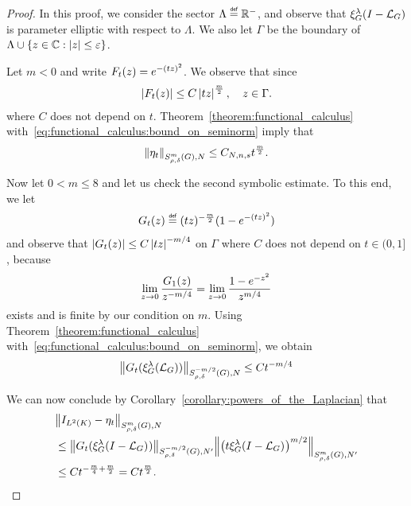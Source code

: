 \begin{proof}
    In this proof, we consider the sector $\Lambda \defeq \R^-$,
    and observe that $\Rep \lambda \BesselPotentialSquared {}$ is parameter elliptic with respect to $\Lambda$.
    We also let $\Gamma$ be the boundary of $\Lambda \cup \{z \in \C : \abs z \leq \epsilon\}$.

    Let $m < 0$ and write $F_t(z) = {\e^{-(t z)^2}}$.
    We observe that since
    \begin{align*}
        \abs {F_t(z)} \leq C \abs {t z}^\frac m 2,
        \quad z \in \Gamma.
    \end{align*}
    where $C$ does not depend on $t$.
    Theorem~\ref{theorem:functional_calculus} with~\eqref{eq:functional_calculus:bound_on_seminorm} imply that
    \begin{align*}
        \SymbolSemiNorm {m} {\rho, \delta} N {\eta_t}
        \leq C_{N, n, s} t^{\frac m 2}.
    \end{align*}

    Now let $0 < m \leq 8$ and let us check the second symbolic estimate.
    To this end,
    we let
    \begin{align*}
        G_t(z) \defeq (t z)^{-\frac m 2} (1 - \e^{-(t z)^2})
    \end{align*}
    and observe that $\abs {G_t(z)} \leq C \abs {t z}^{-m/4}$ on $\Gamma$ where $C$ does not depend on $t \in (0, 1]$,
    because
    \begin{align*}
        \lim_{z \to 0} \frac {G_1(z)}{z^{-m / 4}}
        = \lim_{z \to 0} \frac {1 - \e^{-z^2}} {z^{m / 4}}
    \end{align*}
    exists and is finite by our condition on $m$.
    Using Theorem~\ref{theorem:functional_calculus} with~\eqref{eq:functional_calculus:bound_on_seminorm},
    we obtain
    \begin{align*}
        \SymbolSemiNorm {-m/2} {\rho, \delta} N {G_t(\Rep \lambda (\Laplacian))}
        \leq C t^{-m/4}
    \end{align*}

    We can now conclude by Corollary~\ref{corollary:powers_of_the_Laplacian} that
    \begin{align*}
        &\SymbolSemiNorm {m} {\rho, \delta } N {\Id {\Lebesgue 2 \CompactGroup} - \eta_t}\\
        &\leq
        \SymbolSemiNorm {-m/2} {\rho, \delta} {N'} {G_t(\Rep \lambda \BesselPotentialSquared {})}
        \SymbolSemiNorm {m} {\rho, \delta} {N'} {\left(t \Rep \lambda \BesselPotentialSquared {}\right)^{m/2}}\\
        &\leq C t^{-\frac m 4 + \frac m 2} = C t^\frac m 2.
    \end{align*}


\end{proof}
